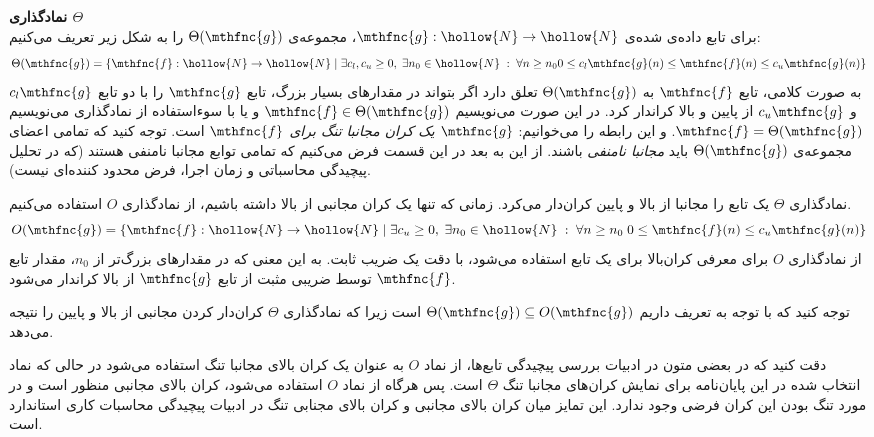 
\textbf{
نمادگذاری 
$\Theta$
}\\
برای تابع داده‌ی شده‌ی 
$\mthfnc{g}: \hollow{N} \rightarrow \hollow{N}$، 
مجموعه‌ی 
$\Theta( \mthfnc{g} )$ 
را به شکل زیر تعریف می‌کنیم:
\[
\Theta( \mthfnc{g} ) = \left\lbrace \mthfnc{f}: \hollow{N} \rightarrow \hollow{N} \;\vert\; \exists c_l,c_u \geq 0, \; \exists n_0 \in \hollow{N} \; : \; \forall n \geq n_0 0 \leq c_l \mthfnc{g}(n) \leq \mthfnc{f}(n) \leq c_u \mthfnc{g}(n) \right\rbrace
\]
به صورت کلامی، تابع 
$\mthfnc{f}$ 
به 
$\Theta( \mthfnc{g} )$ 
تعلق دارد اگر بتواند در مقدارهای بسیار بزرگ، تابع 
$\mthfnc{g}$ 
را با دو تابع 
$c_l \mthfnc{g}$ 
و 
$c_u \mthfnc{g}$ 
از پایین و بالا کراندار کرد. در این صورت می‌نویسیم 
$\mthfnc{f} \in \Theta( \mthfnc{g} )$ 
و یا با سوءاستفاده از نمادگذاری می‌نویسیم 
$\mthfnc{f} = \Theta( \mthfnc{g} )$. 
و این رابطه را می‌خوانیم: 
\textit{
$\mthfnc{g}$ 
یک کران مجانبا تنگ
 برای 
$\mthfnc{f}$
} 
است. توجه کنید که تمامی اعضای مجموعه‌ی 
$\Theta( \mthfnc{g} )$ 
باید 
\textit{
مجانبا نامنفی
} 
باشند. از این به بعد در این قسمت فرض می‌کنیم که تمامی توابع مجانبا نامنفی هستند (که در تحلیل پیچیدگی محاسباتی
و زمان اجرا، فرض محدود کننده‌ای نیست).


نمادگذاری 
$\Theta$ 
یک تابع را مجانبا از بالا و پایین کران‌دار می‌کرد. زمانی که تنها یک کران مجانبی از بالا داشته باشیم، از نمادگذاری 
$O$ 
استفاده می‌کنیم.
\[
O( \mthfnc{g} ) = \left\lbrace \mthfnc{f}: \hollow{N} \rightarrow \hollow{N} \;\vert\; \exists c_u \geq 0, \; \exists n_0 \in \hollow{N} \; : \; \forall n \geq n_0 \; 0 \leq \mthfnc{f}(n) \leq c_u \mthfnc{g}(n) \right\rbrace
\]
از نمادگذاری 
$O$ 
برای معرفی کران‌بالا برای یک تابع استفاده می‌شود، با دقت یک ضریب ثابت. به این معنی که در مقدارهای بزرگ‌تر از 
$n_0$، 
مقدار تابع 
$\mthfnc{f}$ 
توسط ضریبی مثبت از تابع 
$\mthfnc{g}$ 
از بالا کراندار می‌شود.


توجه کنید که با توجه به تعریف داریم 
$\Theta( \mthfnc{g} ) \subseteq O( \mthfnc{g} )$ 
است زیرا که نمادگذاری 
$\Theta$ 
کران‌دار کردن مجانبی از بالا و پایین را نتیجه می‌دهد.


دقت کنید که در بعضی متون در ادبیات بررسی پیچیدگی تابع‌ها، از نماد 
$O$ 
به عنوان یک کران بالای مجانبا تنگ استفاده می‌شود در حالی که نماد انتخاب شده در این پایان‌نامه برای نمایش کران‌های مجانبا تنگ 
$\Theta$ 
است. پس هرگاه از نماد 
$O$ 
استفاده می‌شود، کران بالای مجانبی منظور است و در مورد تنگ بودن این کران فرضی وجود ندارد. این تمایز میان کران بالای مجانبی و کران بالای مجنابی تنگ در ادبیات پیچیدگی محاسبات کاری استاندارد است.

